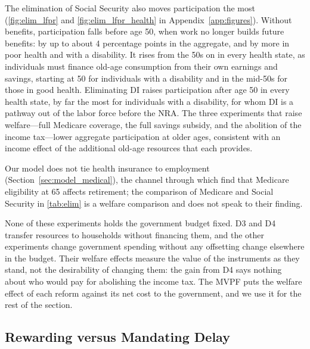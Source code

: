 The elimination of Social Security also moves participation the most (\autoref{fig:elim_lfpr} and \autoref{fig:elim_lfpr_health} in Appendix~\ref{app:figures}). Without benefits, participation falls before age 50, when work no longer builds future benefits: by up to about 4 percentage points in the aggregate, and by more in poor health and with a disability. It rises from the 50s on in every health state, as individuals must finance old-age consumption from their own earnings and savings, starting at 50 for individuals with a disability and in the mid-50s for those in good health. Eliminating DI raises participation after age 50 in every health state, by far the most for individuals with a disability, for whom DI is a pathway out of the labor force before the NRA. The three experiments that raise welfare---full Medicare coverage, the full savings subsidy, and the abolition of the income tax---lower aggregate participation at older ages, consistent with an income effect of the additional old-age resources that each provides.

Our model does not tie health insurance to employment (Section~\ref{sec:model_medical}), the channel through which \citet{french2011effects} find that Medicare eligibility at 65 affects retirement; the comparison of Medicare and Social Security in \autoref{tab:elim} is a welfare comparison and does not speak to their finding.

None of these experiments holds the government budget fixed. D3 and D4 transfer resources to households without financing them, and the other experiments change government spending without any offsetting change elsewhere in the budget. Their welfare effects measure the value of the instruments as they stand, not the desirability of changing them: the gain from D4 says nothing about who would pay for abolishing the income tax. The MVPF puts the welfare effect of each reform against its net cost to the government, and we use it for the rest of the section.

\subsection{Rewarding versus Mandating Delay}\label{sec:results_claiming}

